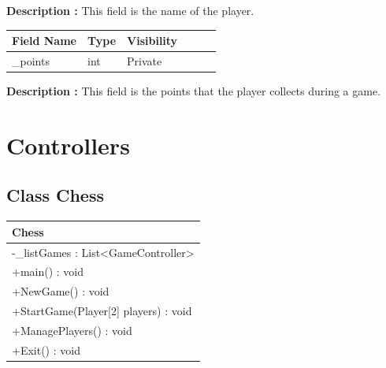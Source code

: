 \documentclass[12pt]{article}
\begin{document}
\textbf{Description :} This field is the name of the player.

\begin{table}[H]
    \begin{tabular}{llllll}
    \hline
    \multicolumn{1}{|l|}{\cellcolor[HTML]{EFEFEF}\textbf{Field Name}} & \multicolumn{1}{l|}{\cellcolor[HTML]{EFEFEF}\textbf{Type}} & \multicolumn{1}{l|}{\cellcolor[HTML]{EFEFEF}\textbf{Visibility}} \\ \hline
    \multicolumn{1}{|l|}{\_points}                                      & \multicolumn{1}{l|}{int}                                 & \multicolumn{1}{l|}{Private}                                   \\ \hline
    \end{tabular}
\end{table}

\textbf{Description :} This field is the points that the player collects during a game.

\newpage


\section{Controllers}


\subsection{Class Chess}

\begin{table}[H]
    \begin{tabular}{|l|}
    \hline
    \rowcolor[HTML]{C0C0C0} 
    \textbf{Chess}                                             \\ \hline
    \rowcolor[HTML]{EFEFEF} 
    -\_listGames : List\textless{}{}GameController\textgreater{}{} \\ \hline
    +main() : void                                             \\ \hline
    +NewGame() : void                                          \\ \hline
    +StartGame(Player{[}2{]} players) : void                   \\ \hline
    +ManagePlayers() : void                                    \\ \hline
    +Exit() : void                                             \\ \hline
    \end{tabular}
\end{table}
\end{document}
